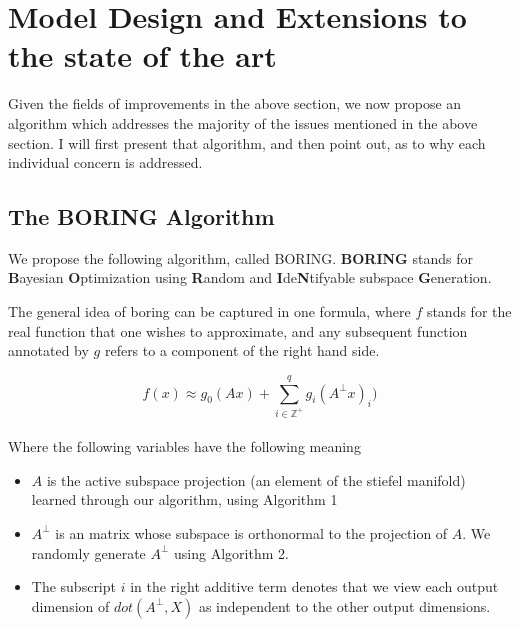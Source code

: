\chapter{Model Design and Extensions to the state of the art}

\ifpdf
    \graphicspath{{Chapter4/Figs/Raster/}{Chapter4/Figs/PDF/}{Chapter4/Figs/}}
\else
    \graphicspath{{Chapter4/Figs/Vector/}{Chapter4/Figs/}}
\fi

Given the fields of improvements in the above section, we now propose an algorithm which addresses the majority of the issues mentioned in the above section.
I will first present that algorithm, and then point out, as to why each individual concern is addressed.

\section{The BORING Algorithm}

We propose the following algorithm, called BORING. \textbf{BORING} stands for \textbf{B}ayesian \textbf{O}ptimization using \textbf{R}andom and \textbf{I}de\textbf{N}tifyable subspace \textbf{G}eneration.

The general idea of boring can be captured in one formula, where $f$ stands for the real function that one wishes to approximate, and any subsequent function annotated by $g$ refers to a component of the right hand side.

\begin{equation}
f(x) \approx g_0(A x) + \sum_{i \in \mathbb{Z}^+}^{q} g_i( A^{\bot} x)_i )
\label{eq:dimRedEquation}
\end{equation} \\

Where the following variables have the following meaning
\begin{itemize}
\item $A$ is the active subspace projection (an element of the stiefel manifold) learned through our algorithm, using Algorithm 1
\item $A^{\bot}$ is an matrix whose subspace is orthonormal to the projection of $A$.
We randomly generate $A^{\bot}$ using Algorithm 2.
\item The subscript $i$ in the right additive term denotes that we view each output dimension of $dot(A^{\bot}, X)$ as independent to the other output dimensions.

\end{itemize}


